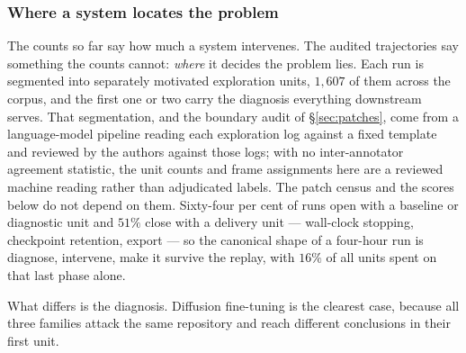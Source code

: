 \subsubsection{Where a system locates the problem}
\label{sec:frames}

The counts so far say how much a system intervenes. The audited trajectories say something the counts
cannot: \emph{where} it decides the problem lies. Each run is segmented into separately motivated exploration units,
$1{,}607$ of them across the corpus, and the first one or two carry the diagnosis everything downstream
serves. That segmentation, and the boundary audit of \S\ref{sec:patches},
come from a language-model pipeline reading each exploration log against a fixed template and reviewed
by the authors against those logs; with no inter-annotator agreement statistic, the unit counts and
frame assignments here are a reviewed machine reading rather than adjudicated labels. The patch census
and the scores below do not depend on them. Sixty-four per cent of runs open with a baseline or diagnostic unit and
$51\%$ close with a delivery unit --- wall-clock stopping, checkpoint retention, export --- so the
canonical shape of a four-hour run is diagnose, intervene, make it survive the replay, with $16\%$ of
all units spent on that last phase alone.

What differs is the diagnosis. Diffusion fine-tuning is the clearest case, because all three families
attack the same repository and reach different conclusions in their first unit.

